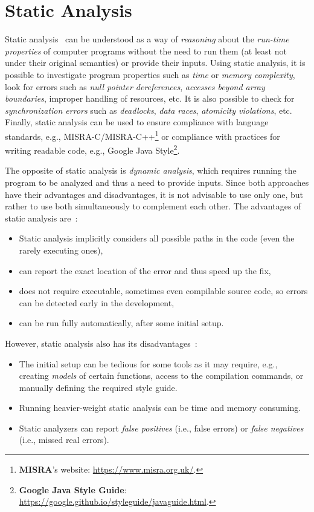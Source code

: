 \section{Static Analysis}
\label{static-analysis}

Static analysis~\cite{bc, static-analysis-EMANUELSSON20085, testovani-herout} can be understood as a way of \textit{reasoning} about the \textit{run-time properties} of computer programs without the need to run them (at least not under their original semantics) or provide their inputs. Using static analysis, it is possible to investigate program properties such as \textit{time} or \textit{memory complexity}, look for errors such as \textit{null pointer dereferences}, \textit{accesses beyond array boundaries}, improper handling of resources, etc. It is also possible to check for \textit{synchronization errors} such as \textit{deadlocks}, \textit{data races}, \textit{atomicity violations}, etc. Finally, static analysis can be used to ensure compliance with language standards, e.g., MISRA-C/MISRA-C++\footnote{\textbf{MISRA}'s website: \url{https://www.misra.org.uk/}.} or compliance with practices for writing readable code, e.g., Google Java Style\footnote{\textbf{Google Java Style Guide}: \url{https://google.github.io/styleguide/javaguide.html}.}.

The opposite of static analysis is \textit{dynamic analysis}, which requires running the program to be analyzed and thus a need to provide inputs. Since both approaches have their advantages and disadvantages, it is not advisable to use only one, but rather to use both simultaneously to complement each other. The advantages of static analysis are~\cite{bc, static-analysis-pros-cons}:
\begin{itemize}
    \item Static analysis implicitly considers all possible paths in the code (even the rarely executing ones),
    \item can report the exact location of the error and thus speed up the fix,
    \item does not require executable, sometimes even compilable source code, so errors can be detected early in the development,
    \item can be run fully automatically, after some initial setup.
\end{itemize}

However, static analysis also has its disadvantages~\cite{testovani-herout, static-analysis-pros-cons}:
\begin{itemize}
    \item The initial setup can be tedious for some tools as it may require, e.g., creating \textit{models} of certain functions, access to the compilation commands, or manually defining the required style guide.
    \item Running heavier-weight static analysis can be time and memory consuming.
    \item Static analyzers can report \textit{false positives} (i.e., false errors) or \textit{false negatives} (i.e., missed real errors).
\end{itemize}

